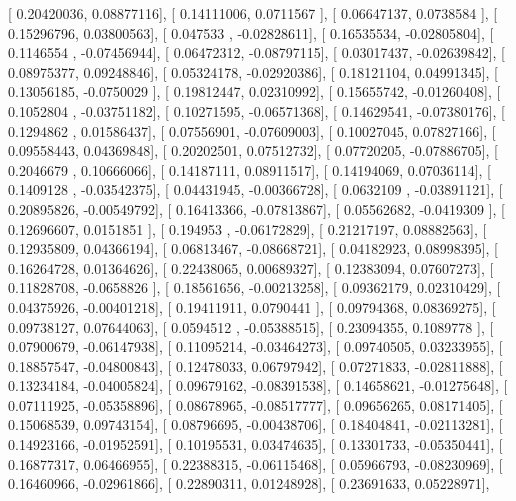 \documentclass{article}
\begin{document}
       [ 0.20420036,  0.08877116],
       [ 0.14111006,  0.0711567 ],
       [ 0.06647137,  0.0738584 ],
       [ 0.15296796,  0.03800563],
       [ 0.047533  , -0.02828611],
       [ 0.16535534, -0.02805804],
       [ 0.1146554 , -0.07456944],
       [ 0.06472312, -0.08797115],
       [ 0.03017437, -0.02639842],
       [ 0.08975377,  0.09248846],
       [ 0.05324178, -0.02920386],
       [ 0.18121104,  0.04991345],
       [ 0.13056185, -0.0750029 ],
       [ 0.19812447,  0.02310992],
       [ 0.15655742, -0.01260408],
       [ 0.1052804 , -0.03751182],
       [ 0.10271595, -0.06571368],
       [ 0.14629541, -0.07380176],
       [ 0.1294862 ,  0.01586437],
       [ 0.07556901, -0.07609003],
       [ 0.10027045,  0.07827166],
       [ 0.09558443,  0.04369848],
       [ 0.20202501,  0.07512732],
       [ 0.07720205, -0.07886705],
       [ 0.2046679 ,  0.10666066],
       [ 0.14187111,  0.08911517],
       [ 0.14194069,  0.07036114],
       [ 0.1409128 , -0.03542375],
       [ 0.04431945, -0.00366728],
       [ 0.0632109 , -0.03891121],
       [ 0.20895826, -0.00549792],
       [ 0.16413366, -0.07813867],
       [ 0.05562682, -0.0419309 ],
       [ 0.12696607,  0.0151851 ],
       [ 0.194953  , -0.06172829],
       [ 0.21217197,  0.08882563],
       [ 0.12935809,  0.04366194],
       [ 0.06813467, -0.08668721],
       [ 0.04182923,  0.08998395],
       [ 0.16264728,  0.01364626],
       [ 0.22438065,  0.00689327],
       [ 0.12383094,  0.07607273],
       [ 0.11828708, -0.0658826 ],
       [ 0.18561656, -0.00213258],
       [ 0.09362179,  0.02310429],
       [ 0.04375926, -0.00401218],
       [ 0.19411911,  0.0790441 ],
       [ 0.09794368,  0.08369275],
       [ 0.09738127,  0.07644063],
       [ 0.0594512 , -0.05388515],
       [ 0.23094355,  0.1089778 ],
       [ 0.07900679, -0.06147938],
       [ 0.11095214, -0.03464273],
       [ 0.09740505,  0.03233955],
       [ 0.18857547, -0.04800843],
       [ 0.12478033,  0.06797942],
       [ 0.07271833, -0.02811888],
       [ 0.13234184, -0.04005824],
       [ 0.09679162, -0.08391538],
       [ 0.14658621, -0.01275648],
       [ 0.07111925, -0.05358896],
       [ 0.08678965, -0.08517777],
       [ 0.09656265,  0.08171405],
       [ 0.15068539,  0.09743154],
       [ 0.08796695, -0.00438706],
       [ 0.18404841, -0.02113281],
       [ 0.14923166, -0.01952591],
       [ 0.10195531,  0.03474635],
       [ 0.13301733, -0.05350441],
       [ 0.16877317,  0.06466955],
       [ 0.22388315, -0.06115468],
       [ 0.05966793, -0.08230969],
       [ 0.16460966, -0.02961866],
       [ 0.22890311,  0.01248928],
       [ 0.23691633,  0.05228971],
\end{document}
